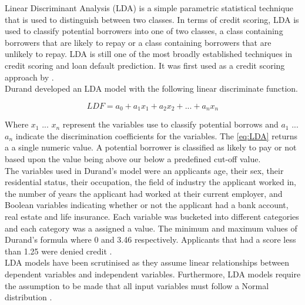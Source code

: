 Linear Discriminant Analysis (LDA) is a simple parametric statistical technique that is used to distinguish between two classes. In terms of credit scoring, LDA is used to classify potential borrowers into one of two classes, a class containing borrowers that are likely to repay or a class containing borrowers that are unlikely to repay. LDA is still one of the most broadly established techniques in credit scoring and loan default prediction. It was first used as a credit scoring approach by \textcite{DurandLDA}. \\

Durand developed an LDA model with the following linear discriminate function.

\vspace{15pt}

\begin{equation} \label{eq:LDA}
LDF = a_{0} + a_{1}x_{1} + a_{2}x_{2}+ ... +  a_{n}x_{n}
\end{equation}

\vspace{15pt}

Where $x_{1}$ ... $x_{n}$ represent the variables use to classify potential borrows and $a_{1}$ ... $a_{n}$ indicate the discrimination coefficients for the variables. The \ref{eq:LDA} returns a a single numeric value. A potential borrower is classified as likely to pay or not based upon the value being above our below a predefined cut-off value. \\

The variables used in Durand's model were an applicants age, their sex, their residential status, their occupation, the field of industry the applicant worked in, the number of years the applicant had worked at their current employer, and Boolean variables indicating whether or not the applicant had a bank account, real estate and life insurance. Each variable was bucketed into different categories and each category was a assigned a value. The minimum and maximum values of Durand's formula where 0 and 3.46 respectively. Applicants that had a score less than 1.25 were denied credit \parencite{DurandLDA}.  \\

LDA models have been scrutinised as they assume linear relationships
between dependent variables and independent variables. Furthermore, LDA models require the assumption to be made that all input variables must follow a Normal distribution \parencite{CreditScoringTechniquesOverview}. \newpage


